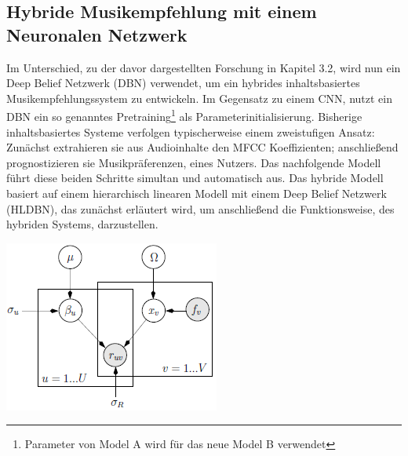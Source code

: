 \documentclass[twosided,a4,10pt]{article}
\begin{document}
\begin{multicols}{2}
		\subsection{Hybride Musikempfehlung mit einem Neuronalen Netzwerk}
		Im Unterschied, zu der davor dargestellten Forschung in Kapitel 3.2, wird nun ein Deep Belief Netzwerk (DBN) verwendet, um ein hybrides inhaltsbasiertes Musikempfehlungssystem zu entwickeln. Im Gegensatz zu einem CNN, nutzt ein DBN ein so genanntes Pretraining\footnote[14]{Parameter von Model A wird für das neue Model B verwendet} als Parameterinitialisierung. Bisherige inhaltsbasiertes Systeme verfolgen typischerweise einem zweistufigen Ansatz: Zunächst extrahieren sie aus Audioinhalte den MFCC Koeffizienten; anschließend prognostizieren sie Musikpräferenzen, eines Nutzers. Das nachfolgende Modell führt diese beiden Schritte simultan und automatisch aus. \cite{wang}\newline
		Das hybride Modell basiert auf einem hierarchisch linearen Modell mit einem Deep Belief Netzwerk (HLDBN), das zunächst erläutert wird, um anschließend die Funktionsweise, des hybriden Systems, darzustellen.
		\begin{minipage}{0.45\textwidth}
			\centering
			\includegraphics{img/hlmdbn.png}
			\label{img:hlmdbn}
		\end{minipage}

\end{multicols}
\end{document}
